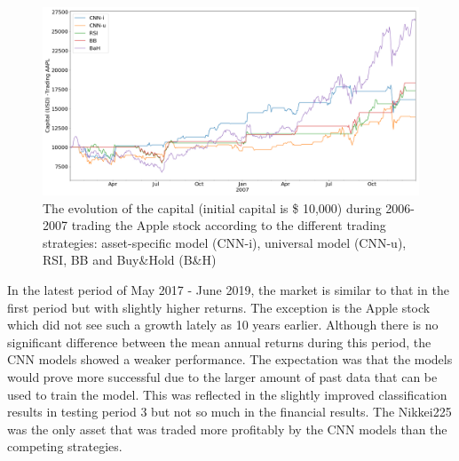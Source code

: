 \documentclass[11pt, a4paper]{article}
\begin{document}
\begin{figure}[H]
    \centering
    \includegraphics[width=\textwidth]{images/capitals/Capitals1_AAPL.png}
    \caption{The evolution of the capital (initial capital is \$ 10,000) during 2006-2007 trading the Apple stock according to the different trading strategies: asset-specific model (CNN-i), universal model (CNN-u), RSI, BB and Buy\&Hold (B\&H)}
    \label{fig:P1_AAPLcapevol}
\end{figure}

In the latest period of May 2017 - June 2019, the market is similar to that in the first period but with slightly higher returns. The exception is the Apple stock which did not see such a growth lately as 10 years earlier. Although there is no significant difference between the mean annual returns during this period, the CNN models showed a weaker performance. The expectation was that the models would prove more successful due to the larger amount of past data that can be used to train the model. 
This was reflected in the slightly improved classification results in testing period 3 but not so much in the financial results. The Nikkei225 was the only asset that was traded more profitably by the CNN models than the competing strategies.
\end{document}

